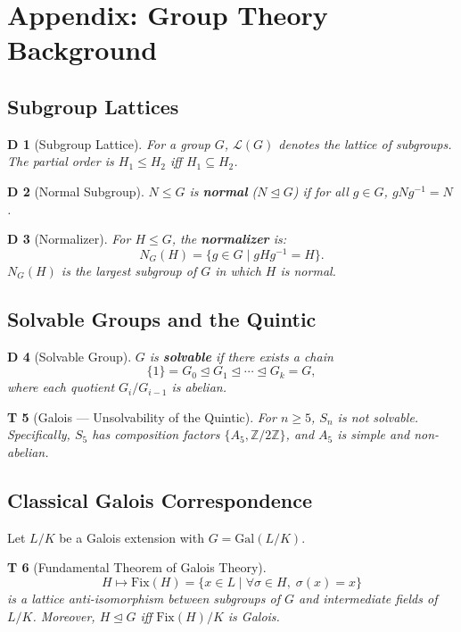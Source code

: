 \documentclass[12pt,a4paper]{article}
\newtheorem{theorem}Theorem[section]
\newtheorem{definition}[theorem]Definition
\theoremstyle{remark}
\newcommand{\Z}{\mathbb{Z}}
\newcommand{\Gal}{\mathrm{Gal}}
\newcommand{\Fix}{\mathrm{Fix}}
\newcommand{\Normal}{\trianglelefteq}
\begin{document}
\section{Appendix: Group Theory Background}
\subsection{Subgroup Lattices}
\begin{definition}[Subgroup Lattice]
For a group \(G\), \(\mathcal{L}(G)\) denotes the lattice of subgroups. The partial order is \(H_1 \leq H_2\) iff \(H_1 \subseteq H_2\).
\end{definition}

\begin{definition}[Normal Subgroup]
\(N \leq G\) is \textbf{normal} (\(N \Normal G\)) if for all \(g \in G\), \(g N g^{-1} = N\).
\end{definition}

\begin{definition}[Normalizer]
For \(H \leq G\), the \textbf{normalizer} is:
\begin{equation}
    N_G(H) = \{g \in G \mid g H g^{-1} = H\}.
\end{equation}
\(N_G(H)\) is the largest subgroup of \(G\) in which \(H\) is normal.
\end{definition}

\subsection{Solvable Groups and the Quintic}
\begin{definition}[Solvable Group]
\(G\) is \textbf{solvable} if there exists a chain
\begin{equation}
    \{1\} = G_0 \Normal G_1 \Normal \cdots \Normal G_k = G,
\end{equation}
where each quotient \(G_i / G_{i-1}\) is abelian.
\end{definition}

\begin{theorem}[Galois --- Unsolvability of the Quintic]
For \(n \geq 5\), \(S_n\) is not solvable. Specifically, \(S_5\) has composition factors \(\{A_5, \Z/2\Z\}\), and \(A_5\) is simple and non-abelian.
\end{theorem}

\subsection{Classical Galois Correspondence}
Let \(L/K\) be a Galois extension with \(G = \Gal(L/K)\).

\begin{theorem}[Fundamental Theorem of Galois Theory]
\[
    H \mapsto \Fix(H) = \{x \in L \mid \forall \sigma \in H,\; \sigma(x) = x\}
\]
is a lattice anti-isomorphism between subgroups of \(G\) and intermediate fields of \(L/K\). Moreover, \(H \Normal G\) iff \(\Fix(H)/K\) is Galois.
\end{theorem}
\end{document}
